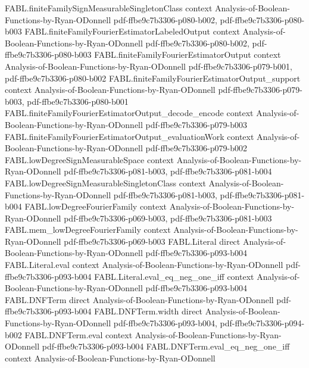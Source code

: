\begin{theorem}
\proofstep
  {FABL.finiteFamilySignMeasurableSingletonClass}
  {context}
  {Analysis-of-Boolean-Functions-by-Ryan-ODonnell}
  {pdf-ffbe9c7b3306-p080-b002,
    pdf-ffbe9c7b3306-p080-b003}
\proofstep
  {FABL.finiteFamilyFourierEstimatorLabeledOutput}
  {context}
  {Analysis-of-Boolean-Functions-by-Ryan-ODonnell}
  {pdf-ffbe9c7b3306-p080-b002,
    pdf-ffbe9c7b3306-p080-b003}
\proofstep
  {FABL.finiteFamilyFourierEstimatorOutput}
  {context}
  {Analysis-of-Boolean-Functions-by-Ryan-ODonnell}
  {pdf-ffbe9c7b3306-p079-b001,
    pdf-ffbe9c7b3306-p080-b002}
\proofstep
  {FABL.finiteFamilyFourierEstimatorOutput_support}
  {context}
  {Analysis-of-Boolean-Functions-by-Ryan-ODonnell}
  {pdf-ffbe9c7b3306-p079-b003,
    pdf-ffbe9c7b3306-p080-b001}
\proofstep
  {FABL.finiteFamilyFourierEstimatorOutput_decode_encode}
  {context}
  {Analysis-of-Boolean-Functions-by-Ryan-ODonnell}
  {pdf-ffbe9c7b3306-p079-b003}
\proofstep
  {FABL.finiteFamilyFourierEstimatorOutput_evaluationWork}
  {context}
  {Analysis-of-Boolean-Functions-by-Ryan-ODonnell}
  {pdf-ffbe9c7b3306-p079-b002}
\proofstep
  {FABL.lowDegreeSignMeasurableSpace}
  {context}
  {Analysis-of-Boolean-Functions-by-Ryan-ODonnell}
  {pdf-ffbe9c7b3306-p081-b003,
    pdf-ffbe9c7b3306-p081-b004}
\proofstep
  {FABL.lowDegreeSignMeasurableSingletonClass}
  {context}
  {Analysis-of-Boolean-Functions-by-Ryan-ODonnell}
  {pdf-ffbe9c7b3306-p081-b003,
    pdf-ffbe9c7b3306-p081-b004}
\proofstep
  {FABL.lowDegreeFourierFamily}
  {context}
  {Analysis-of-Boolean-Functions-by-Ryan-ODonnell}
  {pdf-ffbe9c7b3306-p069-b003,
    pdf-ffbe9c7b3306-p081-b003}
\proofstep
  {FABL.mem_lowDegreeFourierFamily}
  {context}
  {Analysis-of-Boolean-Functions-by-Ryan-ODonnell}
  {pdf-ffbe9c7b3306-p069-b003}
\proofstep
  {FABL.Literal}
  {direct}
  {Analysis-of-Boolean-Functions-by-Ryan-ODonnell}
  {pdf-ffbe9c7b3306-p093-b004}
\proofstep
  {FABL.Literal.eval}
  {context}
  {Analysis-of-Boolean-Functions-by-Ryan-ODonnell}
  {pdf-ffbe9c7b3306-p093-b004}
\proofstep
  {FABL.Literal.eval_eq_neg_one_iff}
  {context}
  {Analysis-of-Boolean-Functions-by-Ryan-ODonnell}
  {pdf-ffbe9c7b3306-p093-b004}
\proofstep
  {FABL.DNFTerm}
  {direct}
  {Analysis-of-Boolean-Functions-by-Ryan-ODonnell}
  {pdf-ffbe9c7b3306-p093-b004}
\proofstep
  {FABL.DNFTerm.width}
  {direct}
  {Analysis-of-Boolean-Functions-by-Ryan-ODonnell}
  {pdf-ffbe9c7b3306-p093-b004,
    pdf-ffbe9c7b3306-p094-b002}
\proofstep
  {FABL.DNFTerm.eval}
  {context}
  {Analysis-of-Boolean-Functions-by-Ryan-ODonnell}
  {pdf-ffbe9c7b3306-p093-b004}
\proofstep
  {FABL.DNFTerm.eval_eq_neg_one_iff}
  {context}
  {Analysis-of-Boolean-Functions-by-Ryan-ODonnell}

\end{theorem}
